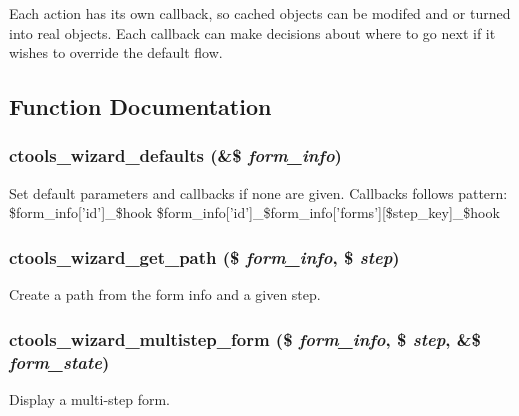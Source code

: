 Each action has its own callback, so cached objects can be modifed and or turned into real objects. Each callback can make decisions about where to go next if it wishes to override the default flow. 

\subsection{Function Documentation}
\hypertarget{wizard_8inc_aa26a3f8dffd117ea24de566d81f34bf9}{
\subsubsection[{ctools\_\-wizard\_\-defaults}]{\setlength{\rightskip}{0pt plus 5cm}ctools\_\-wizard\_\-defaults (\&\$ {\em form\_\-info})}}
\label{wizard_8inc_aa26a3f8dffd117ea24de566d81f34bf9}
Set default parameters and callbacks if none are given. Callbacks follows pattern: \$form\_\-info\mbox{[}'id'\mbox{]}\_\-\$hook \$form\_\-info\mbox{[}'id'\mbox{]}\_\-\$form\_\-info\mbox{[}'forms'\mbox{]}\mbox{[}\$step\_\-key\mbox{]}\_\-\$hook \hypertarget{wizard_8inc_afc7a25ab27f2c6ec84fe095b4be44541}{
\subsubsection[{ctools\_\-wizard\_\-get\_\-path}]{\setlength{\rightskip}{0pt plus 5cm}ctools\_\-wizard\_\-get\_\-path (\$ {\em form\_\-info}, \/  \$ {\em step})}}
\label{wizard_8inc_afc7a25ab27f2c6ec84fe095b4be44541}
Create a path from the form info and a given step. \hypertarget{wizard_8inc_a0b42108018cbf45ee377a2fbbe980716}{
\subsubsection[{ctools\_\-wizard\_\-multistep\_\-form}]{\setlength{\rightskip}{0pt plus 5cm}ctools\_\-wizard\_\-multistep\_\-form (\$ {\em form\_\-info}, \/  \$ {\em step}, \/  \&\$ {\em form\_\-state})}}
\label{wizard_8inc_a0b42108018cbf45ee377a2fbbe980716}
Display a multi-\/step form.

